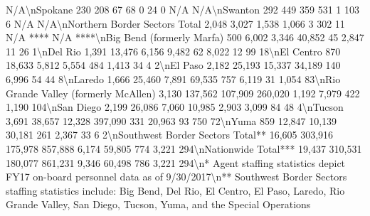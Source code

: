 \documentclass[
]{krantz}
\makeatletter
\newenvironment{Shaded}{\begin{snugshade}}{\end{snugshade}}
\newenvironment{kframe}{%
\medskip{}
\setlength{\fboxsep}{.8em}
 \def\at@end@of@kframe{}%
 \ifinner\ifhmode%
  \def\at@end@of@kframe{\end{minipage}}%
  \begin{minipage}{\columnwidth}%
 \fi\fi%
 \def\FrameCommand##1{\hskip\@totalleftmargin \hskip-\fboxsep
 \colorbox{shadecolor}{##1}\hskip-\fboxsep
     \hskip-\linewidth \hskip-\@totalleftmargin \hskip\columnwidth}%
 \MakeFramed {\advance\hsize-\width
   \@totalleftmargin\z@ \linewidth\hsize
   \@setminipage}}%
 {\par\unskip\endMakeFramed%
 \at@end@of@kframe}
\renewenvironment{Shaded}{\begin{kframe}}{\end{kframe}}
\makeatother
\begin{document}
\begin{Shaded}
\begin{Highlighting}[]
N/A\textbackslash{}nSpokane                                           230                208                       67                     68                 0               24               0              N/A      N/A\textbackslash{}nSwanton                                           292               449                       359                    531                 1               103               6             N/A      N/A\textbackslash{}nNorthern Border Sectors Total                    2,048             3,027                     1,538                  1,066                3               302              11        N/A ****    N/A   ****\textbackslash{}nBig Bend (formerly Marfa)                         500              6,002                     3,346                  40,852              45              2,847             11             26       1\textbackslash{}nDel Rio                                          1,391             13,476                    6,156                  9,482               62              8,022             12             99       18\textbackslash{}nEl Centro                                         870              18,633                    5,812                  5,554              484              1,413             34             4        2\textbackslash{}nEl Paso                                          2,182             25,193                   15,337                  34,189             140              6,996             54             44       8\textbackslash{}nLaredo                                           1,666             25,460                    7,891                  69,535             757              6,119             31            1,054     83\textbackslash{}nRio Grande Valley (formerly McAllen)             3,130            137,562                  107,909                 260,020            1,192             7,979            422            1,190    104\textbackslash{}nSan Diego                                        2,199             26,086                    7,060                  10,985            2,903             3,099             84             48       4\textbackslash{}nTucson                                           3,691             38,657                   12,328                 397,090             331             20,963             93            750       72\textbackslash{}nYuma                                              859              12,847                   10,139                  30,181             261              2,367             33             6        2\textbackslash{}nSouthwest Border Sectors Total**                16,605            303,916                  175,978                 857,888            6,174            59,805            774            3,221    294\textbackslash{}nNationwide Total***                             19,437            310,531                  180,077                 861,231            9,346            60,498            786            3,221    294\textbackslash{}n* Agent staffing statistics depict FY17 on{-}board personnel data as of 9/30/2017\textbackslash{}n** Southwest Border Sectors staffing statistics include: Big Bend, Del Rio, El Centro, El Paso, Laredo, Rio Grande Valley, San Diego, Tucson, Yuma, and the Special Operations 
\end{Highlighting}
\end{Shaded}
\end{document}
